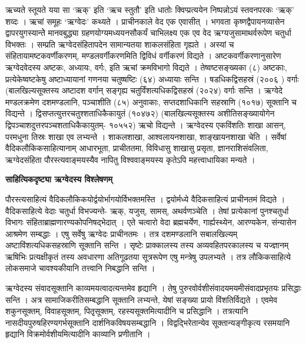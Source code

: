 \documentclass[11pt, a5paper]{article}
\newcommand{\customparagraph}[1]{
    \noindent \textbf{#1} \par
    \penalty 10000 %
    \vspace{0.1cm plus 0.05cm minus 0.02cm}
    \penalty 10000 %
}
\begin{document}
ऋच्यते स्तूयते यया सा ‘ऋक्’ इति ‘ऋच स्तुतौ’ इति धातोः क्विप्प्रत्ययेन निष्पन्नोऽयं स्तवनपरकः ‘ऋक्’ शव्दः । ऋचां समूहः ‘ऋग्वेदः’ कथ्यते । प्राचीनकाले वेद एक एवासीत् । भगवता कृष्णद्वैपायनव्यासेन द्वापरयुगस्यान्तेे मानवबुद्ध्या ग्रहणयोग्यमध्ययनसौकर्यं चाभिलक्ष्य एक एव वेद ऋग्यजुसामाथर्वरूपेण चतुर्धा विभक्तः । सम्प्रति ऋग्वेदसंहितापदेन सामान्यतया शाकलसंहिता गृह्यते । अस्यां च संहितायामष्टकवर्णीकरणम्, मण्डलवर्गीकरणमिति द्विविधं वर्गीकरणं विद्यते । अष्टकवर्गीकरणानुसारेण ऋग्वेदवेदस्य अष्टकः, अध्यायः, वर्गः, इति ऋचां क्रमविभागो विद्यते । तेष्वष्टसङ्‌ख्यका (८) अष्टकाः, प्रत्येकेष्वष्टकेषु अष्टाध्यायानां गणनया चतुष्षष्टिः (६४) अध्यायाः सन्ति । षडधिकद्विसहस्रं (२००६ ) वर्गाः (बालखिल्यसूक्तस्य अष्टादश वर्गान् सङ्‌गृह्य चतुर्विंशत्यधिकद्विसहस्रं (२०२४) वर्गाः सन्ति । ऋग्वेदे  मण्डलक्रमेण दशमण्डलानि, पञ्चाशीति (८५) अनुवाकाः, सप्तदशाधिकानि सहस्राणि (१०१७) सूक्तानि च विद्यन्ते । द्विसप्तत्युत्तरचतुश्शताधिकैकायुतं (१०४७२) (बालखिल्यसूक्तस्य अशीतिसङ्‌ख्यायोगेन द्विपञ्चाशदुत्तरपञ्चशताधिकैकायुतम्- १०५५२) ऋचो विद्यन्ते । ऋग्वेदस्य एकविंशतिः शाखा आसन्, परमधुना तिस्रः शाखा एव लभ्यन्ते । शाकलशाखा, आश्वलायनशाखा, शाङ्‌खायनशाखा चेति । सर्वेषां वैदिकलौकिकसाहित्यानाम् आधारभूता, प्राचीततमा, विविधासु शाखासु प्रसृता, ज्ञानराशिसंवलिता, ऋग्वेदसंहिता पौरस्त्यवाङ्मयस्यैव नापितु विश्ववाङ्मयस्य कृतेऽपि महत्त्वाधायिका मन्यते ।

\customparagraph{\textbf{साहित्यिकदृष्ट्या ऋग्वेदस्य विश्लेषणम्}}

पौरस्त्यसाहित्यं वैदिकलौकिकयोर्द्वयोर्भागयोर्विभक्तमस्ति । द्वयोर्मध्ये वैदिकसाहित्यं प्राचीनतमं विद्यते । वैदिकसाहित्ये वेदाः चतुर्धा विभज्यन्ते- ऋक्, यजुस्, सामस्, अथर्वणञ्चेति । तेषां प्रत्येकानां पुनश्चतुर्धा विभागः संहिताब्राह्मणारण्यकोपनिषद्‌भेदात् । एते चत्वारो वेदा ब्रह्मचर्येण, गार्ह्यस्थ्येन, आरण्यकेन, संन्यासेन आश्रमेण सम्बद्धाः । एषु सर्वेषु ऋग्वेदः प्राचीनतमः । तत्र दशमण्डलानि सबालखिल्यम् अष्टाविंशत्यधिकसहस्राणि सूक्तानि सन्ति । सृष्टेः प्राक्कालस्य तस्य अव्यवहितपरकालस्य च यज्ज्ञानम् ऋषिभिः प्रत्यक्षीकृतं तस्य अवधारणा अतिगूढतया सूत्ररूपेण एषु मन्त्रेषु उपलभ्यते । तत्र लौकिकसाहित्ये लोकसमाजे चावश्यकीयानि तत्त्वानि निबद्धानि सन्ति ।

ऋग्वेदस्य संवादसूक्तानि काव्यमयत्वादत्यन्तमेव हृद्यानि । तेषु पुरुरवोर्वशीसंवादयमयमीसंवादप्रभृतयः प्रसिद्धाः सन्ति । अत्र सामाजिकरीतिसम्बद्धानि सूक्तानि लभ्यन्ते, येषां सङ्ख्या प्रायो विंशतिर्विद्यते । एवमेव शकुनसूक्तम्, विवाहसूक्तम्, पितृृसूक्तम्, रहस्यसूक्तमित्यादीनि च प्रसिद्धानि । तत्रत्यानि नासदीयपुरुषहिरण्यगर्भसूक्तानि दार्शनिकविषयसम्बद्धानि ।  विद्वद्भिरेतान्येव सूक्तान्यङ्गीकृत्य रसमयानि हृद्यानि विक्रमोर्वशीयमित्यादीनि काव्यानि प्रणीतानि ।
\end{document}
